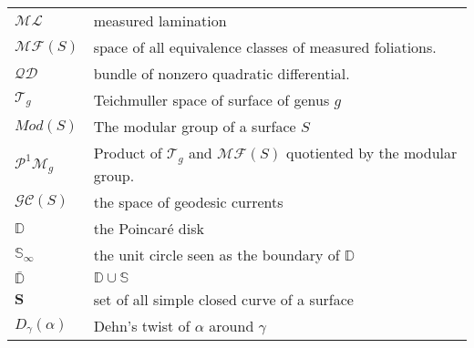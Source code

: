 \begin{tabular}{ll}
  $\mathcal{ML}$ &  measured lamination  \\
  $\mathcal{MF}(S)$ & space of all equivalence classes of measured foliations. \\
  $\mathcal{QD}$ & bundle of nonzero quadratic differential. \\
  $\mathcal{T}_g$ & Teichmuller space of surface of genus $g$ \\
  $Mod(S)$ & The modular group of a surface $S$ \\
  $\mathcal{P}^1 \mathcal{M}_g$ & Product of $\mathcal{T}_g$  and $\mathcal{MF}(S)$ quotiented by the modular group. \\
$\mathcal{GC}(S)$  & the space of geodesic currents \\
$\mathbb{D}$ & the Poincaré disk \\
$\mathbb{S}_{\infty}$ & the unit circle seen as the boundary of $\mathbb{D}$ \\
$\bar{\mathbb{D}}$ & $\mathbb{D} \cup \mathbb{S}$\\
$\mathbf{S}$ & set of all simple closed curve of a surface \\
$D_{\gamma}(\alpha)$ & Dehn's twist of $\alpha$ around $\gamma$
\end{tabular}

